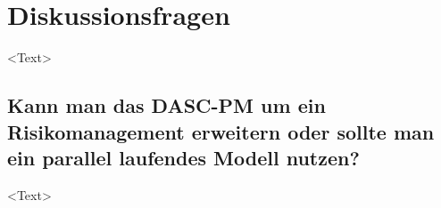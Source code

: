 \section{Diskussionsfragen}

\textless Text\textgreater

\subsection*{Kann man das DASC-PM um ein Risikomanagement erweitern oder sollte man ein parallel laufendes Modell nutzen?}
\textless Text\textgreater
